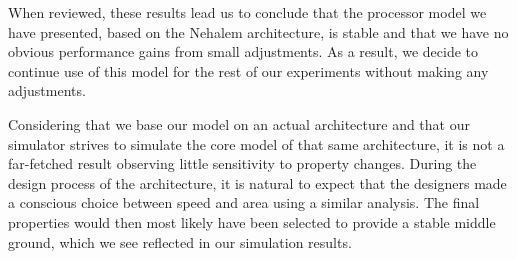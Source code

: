 When reviewed, these results lead us to conclude that the processor model we have presented, based on the Nehalem architecture, is stable and that we have no obvious performance gains from small adjustments.
As a result, we decide to continue use of this model for the rest of our experiments without making any adjustments.

Considering that we base our model on an actual architecture and that our simulator strives to simulate the core model of that same architecture, it is not a far-fetched result observing little sensitivity to property changes.
During the design process of the architecture, it is natural to expect that the designers made a conscious choice between speed and area using a similar analysis.
The final properties would then most likely have been selected to provide a stable middle ground, which we see reflected in our simulation results.
